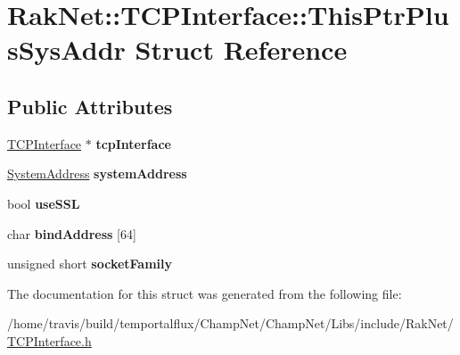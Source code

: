 \hypertarget{struct_rak_net_1_1_t_c_p_interface_1_1_this_ptr_plus_sys_addr}{\section{Rak\-Net\-:\-:T\-C\-P\-Interface\-:\-:This\-Ptr\-Plus\-Sys\-Addr Struct Reference}
\label{struct_rak_net_1_1_t_c_p_interface_1_1_this_ptr_plus_sys_addr}
}
\subsection*{Public Attributes}
\begin{DoxyCompactItemize}
\item 
\hypertarget{struct_rak_net_1_1_t_c_p_interface_1_1_this_ptr_plus_sys_addr_a7330130fb9da5097456871227c713abb}{\hyperlink{class_rak_net_1_1_t_c_p_interface}{T\-C\-P\-Interface} $\ast$ {\bfseries tcp\-Interface}}\label{struct_rak_net_1_1_t_c_p_interface_1_1_this_ptr_plus_sys_addr_a7330130fb9da5097456871227c713abb}

\item 
\hypertarget{struct_rak_net_1_1_t_c_p_interface_1_1_this_ptr_plus_sys_addr_ad9a8eb63edd881a5d833e754d2ae49f9}{\hyperlink{struct_rak_net_1_1_system_address}{System\-Address} {\bfseries system\-Address}}\label{struct_rak_net_1_1_t_c_p_interface_1_1_this_ptr_plus_sys_addr_ad9a8eb63edd881a5d833e754d2ae49f9}

\item 
\hypertarget{struct_rak_net_1_1_t_c_p_interface_1_1_this_ptr_plus_sys_addr_a4285f050fb66df8a14d7785f48520ec2}{bool {\bfseries use\-S\-S\-L}}\label{struct_rak_net_1_1_t_c_p_interface_1_1_this_ptr_plus_sys_addr_a4285f050fb66df8a14d7785f48520ec2}

\item 
\hypertarget{struct_rak_net_1_1_t_c_p_interface_1_1_this_ptr_plus_sys_addr_afc5846d61ac8ea8a6bfc0f0469c7cca1}{char {\bfseries bind\-Address} \mbox{[}64\mbox{]}}\label{struct_rak_net_1_1_t_c_p_interface_1_1_this_ptr_plus_sys_addr_afc5846d61ac8ea8a6bfc0f0469c7cca1}

\item 
\hypertarget{struct_rak_net_1_1_t_c_p_interface_1_1_this_ptr_plus_sys_addr_af099242ad4d6e84062f708ab8f2d57e3}{unsigned short {\bfseries socket\-Family}}\label{struct_rak_net_1_1_t_c_p_interface_1_1_this_ptr_plus_sys_addr_af099242ad4d6e84062f708ab8f2d57e3}

\end{DoxyCompactItemize}


The documentation for this struct was generated from the following file\-:\begin{DoxyCompactItemize}
\item 
/home/travis/build/temportalflux/\-Champ\-Net/\-Champ\-Net/\-Libs/include/\-Rak\-Net/\hyperlink{_t_c_p_interface_8h}{T\-C\-P\-Interface.\-h}\end{DoxyCompactItemize}
